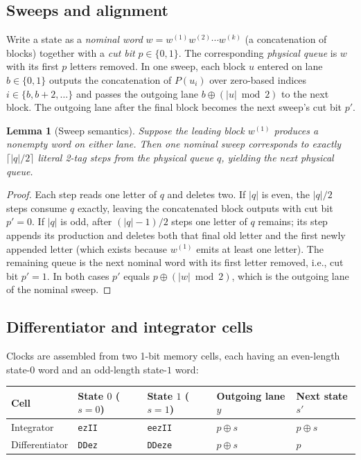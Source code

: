 \documentclass{article}
\newtheorem{lemma}[theorem]{Lemma}
\theoremstyle{definition}
\theoremstyle{remark}
\newcommand{\ttw}[1]{\texttt{#1}}
\begin{document}
\subsection{Sweeps and alignment}

Write a state as a \emph{nominal word} $w = w^{(1)} w^{(2)} \cdots w^{(k)}$ (a concatenation of blocks) together with a \emph{cut bit} $p \in \{0,1\}$.
The corresponding \emph{physical queue} is $w$ with its first $p$ letters removed.
In one sweep, each block $u$ entered on lane $b \in \{0,1\}$ outputs the concatenation of $P(u_i)$ over zero-based indices $i \in \{b, b+2, \ldots\}$ and passes the outgoing lane $b \oplus (|u| \bmod 2)$ to the next block.
The outgoing lane after the final block becomes the next sweep's cut bit $p'$.

\begin{lemma}[Sweep semantics]\label{lem:sweep}
Suppose the leading block $w^{(1)}$ produces a nonempty word on either lane.
Then one nominal sweep corresponds to exactly $\lceil |q|/2 \rceil$ literal 2-tag steps from the physical queue $q$, yielding the next physical queue.
\end{lemma}

\begin{proof}
Each step reads one letter of $q$ and deletes two.
If $|q|$ is even, the $|q|/2$ steps consume $q$ exactly, leaving the concatenated block outputs with cut bit $p' = 0$.
If $|q|$ is odd, after $(|q|-1)/2$ steps one letter of $q$ remains; its step appends its production and deletes both that final old letter and the first newly appended letter (which exists because $w^{(1)}$ emits at least one letter).
The remaining queue is the next nominal word with its first letter removed, i.e., cut bit $p' = 1$.
In both cases $p'$ equals $p \oplus (|w| \bmod 2)$, which is the outgoing lane of the nominal sweep.
\end{proof}

\subsection{Differentiator and integrator cells}

Clocks are assembled from two 1-bit memory cells, each having an even-length state-$0$ word and an odd-length state-$1$ word:

\begin{center}
\begin{tabular}{@{}lllll@{}}
\toprule
Cell & State $0$ ($s=0$) & State $1$ ($s=1$) & Outgoing lane $y$ & Next state $s'$ \\
\midrule
Integrator     & \ttw{ezII} & \ttw{eezII} & $p \oplus s$ & $p \oplus s$ \\
Differentiator & \ttw{DDez} & \ttw{DDeze} & $p \oplus s$ & $p$ \\
\bottomrule
\end{tabular}
\end{center}
\end{document}
